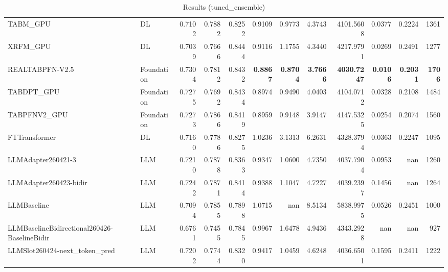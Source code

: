 \begin{table}[htbp]
{\begin{tabular}{ll|rrrrrrrrr|r}
TABM\_GPU & DL & 0.7102 & 0.7882 & 0.8252 & 0.9109 & 0.9773 & 4.3743 & 4101.5608 & 0.0377 & 0.2224 & 1361 \\
XRFM\_GPU & DL & 0.7039 & 0.7666 & 0.8444 & 0.9116 & 1.1755 & 4.3440 & 4217.9791 & 0.0269 & 0.2491 & 1277 \\
REALTABPFN-V2.5 & Foundation & 0.7304 & 0.7812 & 0.8432 & \textbf{0.8867} & \textbf{0.8704} & \textbf{3.7666} & \textbf{4030.7247} & \textbf{0.0106} & \textbf{0.2031} & \textbf{1706} \\
TABDPT\_GPU & Foundation & 0.7275 & 0.7692 & 0.8434 & 0.8974 & 0.9490 & 4.0403 & 4104.0712 & 0.0328 & 0.2108 & 1484 \\
TABPFNV2\_GPU & Foundation & 0.7273 & 0.7866 & 0.8419 & 0.8959 & 0.9148 & 3.9147 & 4147.5325 & 0.0254 & 0.2074 & 1560 \\
\midrule
FTTransformer & DL & 0.7160 & 0.7786 & 0.8275 & 1.0236 & 3.1313 & 6.2631 & 4328.3794 & 0.0363 & 0.2247 & 1095 \\
LLMAdapter260421-3 & LLM & 0.7210 & 0.7878 & 0.8363 & 0.9347 & 1.0600 & 4.7350 & 4037.7904 & 0.0953 & nan & 1260 \\
LLMAdapter260423-bidir & LLM & 0.7242 & 0.7871 & 0.8414 & 0.9388 & 1.1047 & 4.7227 & 4039.2397 & 0.1456 & nan & 1264 \\
LLMBaseline & LLM & 0.7094 & 0.7855 & 0.7898 & 1.0715 & nan & 8.5134 & 5838.9975 & 0.0526 & 0.2451 & 1000 \\
LLMBaselineBidirectional260426-BaselineBidir & LLM & 0.6761 & 0.7455 & 0.7845 & 0.9967 & 1.6478 & 4.9436 & 4343.2928 & nan & nan & 927 \\
LLMSlot260424-next\_token\_pred & LLM & 0.7202 & 0.7744 & 0.8320 & 0.9417 & 1.0459 & 4.6248 & 4036.6501 & 0.1595 & 0.2411 & 1222 \\
\bottomrule
\end{tabular}
}
\caption{Results (tuned_ensemble)}
\label{tab:results_tuned_ensemble}
\end{table}